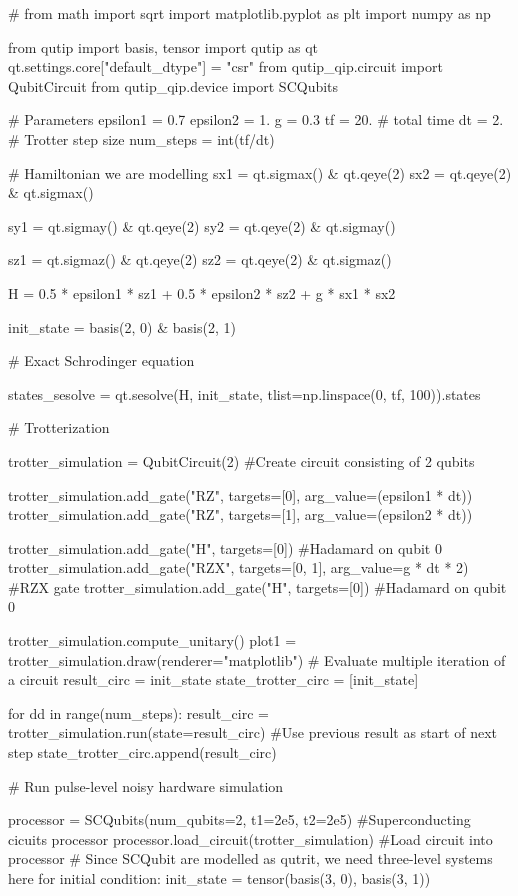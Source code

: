 #%
from math import sqrt
import matplotlib.pyplot as plt
import numpy as np

from qutip import basis, tensor
import qutip as qt
qt.settings.core["default_dtype"] = "csr"
from qutip_qip.circuit import QubitCircuit
from qutip_qip.device import SCQubits


# Parameters
epsilon1 = 0.7
epsilon2 = 1.
g = 0.3
tf = 20.  # total time
dt = 2.  # Trotter step size
num_steps = int(tf/dt)

# Hamiltonian we are modelling
sx1 = qt.sigmax() & qt.qeye(2)
sx2 = qt.qeye(2) & qt.sigmax()

sy1 = qt.sigmay() & qt.qeye(2)
sy2 = qt.qeye(2) & qt.sigmay()

sz1 = qt.sigmaz() & qt.qeye(2)
sz2 = qt.qeye(2) & qt.sigmaz()

H = 0.5 * epsilon1 * sz1 + 0.5 * epsilon2 * sz2 + g * sx1 * sx2

init_state = basis(2, 0) & basis(2, 1)


# Exact Schrodinger equation

states_sesolve = qt.sesolve(H, init_state, tlist=np.linspace(0, tf, 100)).states


# Trotterization

trotter_simulation = QubitCircuit(2) #Create circuit consisting of 2 qubits

trotter_simulation.add_gate("RZ", targets=[0], arg_value=(epsilon1 * dt))
trotter_simulation.add_gate("RZ", targets=[1], arg_value=(epsilon2 * dt))

trotter_simulation.add_gate("H", targets=[0]) #Hadamard on qubit 0
trotter_simulation.add_gate("RZX", targets=[0, 1], arg_value=g * dt * 2) #RZX gate
trotter_simulation.add_gate("H", targets=[0]) #Hadamard on qubit 0

trotter_simulation.compute_unitary()
plot1 = trotter_simulation.draw(renderer="matplotlib")
# Evaluate multiple iteration of a circuit
result_circ = init_state
state_trotter_circ = [init_state]

for dd in range(num_steps):
    result_circ = trotter_simulation.run(state=result_circ) #Use previous result as start of next step
    state_trotter_circ.append(result_circ)

# Run pulse-level noisy hardware simulation

processor = SCQubits(num_qubits=2, t1=2e5, t2=2e5) #Superconducting cicuits processor
processor.load_circuit(trotter_simulation) #Load circuit into processor
# Since SCQubit are modelled as qutrit, we need three-level systems here for initial condition:
init_state = tensor(basis(3, 0), basis(3, 1))

